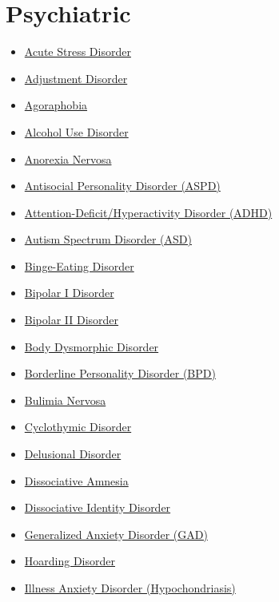 \section*{Psychiatric}
\label{sec:organ_psychiatric}
\begin{itemize}[noitemsep]
  \item \hyperlink{sec:Acute Stress Disorder}{Acute Stress Disorder}
  \item \hyperlink{sec:Adjustment Disorder}{Adjustment Disorder}
  \item \hyperlink{sec:Agoraphobia}{Agoraphobia}
  \item \hyperlink{sec:Alcohol Use Disorder}{Alcohol Use Disorder}
  \item \hyperlink{sec:Anorexia Nervosa}{Anorexia Nervosa}
  \item \hyperlink{sec:Antisocial Personality Disorder (ASPD)}{Antisocial Personality Disorder (ASPD)}
  \item \hyperlink{sec:Attention-Deficit/Hyperactivity Disorder (ADHD)}{Attention-Deficit/Hyperactivity Disorder (ADHD)}
  \item \hyperlink{sec:Autism Spectrum Disorder (ASD)}{Autism Spectrum Disorder (ASD)}
  \item \hyperlink{sec:Binge-Eating Disorder}{Binge-Eating Disorder}
  \item \hyperlink{sec:Bipolar I Disorder}{Bipolar I Disorder}
  \item \hyperlink{sec:Bipolar II Disorder}{Bipolar II Disorder}
  \item \hyperlink{sec:Body Dysmorphic Disorder}{Body Dysmorphic Disorder}
  \item \hyperlink{sec:Borderline Personality Disorder (BPD)}{Borderline Personality Disorder (BPD)}
  \item \hyperlink{sec:Bulimia Nervosa}{Bulimia Nervosa}
  \item \hyperlink{sec:Cyclothymic Disorder}{Cyclothymic Disorder}
  \item \hyperlink{sec:Delusional Disorder}{Delusional Disorder}
  \item \hyperlink{sec:Dissociative Amnesia}{Dissociative Amnesia}
  \item \hyperlink{sec:Dissociative Identity Disorder}{Dissociative Identity Disorder}
  \item \hyperlink{sec:Generalized Anxiety Disorder (GAD)}{Generalized Anxiety Disorder (GAD)}
  \item \hyperlink{sec:Hoarding Disorder}{Hoarding Disorder}
  \item \hyperlink{sec:Illness Anxiety Disorder (Hypochondriasis)}{Illness Anxiety Disorder (Hypochondriasis)}

\end{itemize}
